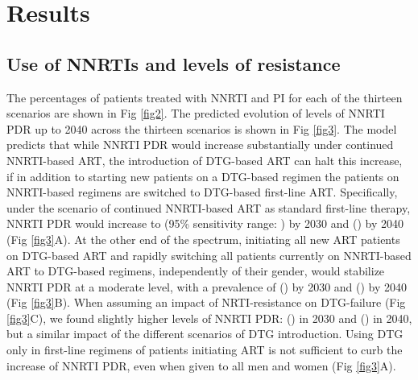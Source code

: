 \documentclass[10pt,letterpaper]{article}
\begin{document}
\section*{Results}
\subsection*{Use of NNRTIs and levels of resistance}
The percentages of patients treated with NNRTI and PI for each of the thirteen scenarios are shown in Fig \ref{fig2}. The predicted evolution of levels of NNRTI PDR up to 2040 across the thirteen scenarios is shown in Fig \ref{fig3}. The model predicts that while NNRTI PDR would increase substantially under continued NNRTI-based ART, the introduction of DTG-based ART can halt this increase, if in addition to starting new patients on a DTG-based regimen the patients on NNRTI-based regimens are switched to DTG-based first-line ART. Specifically, under the scenario of continued NNRTI-based ART as standard first-line therapy, NNRTI PDR would increase to \numberda (95\% sensitivity range: \numberdb) by 2030 and \numberea (\numbereb) by 2040 (Fig \ref{fig3}A). At the other end of the spectrum, initiating all new ART patients on DTG-based ART and rapidly switching all patients currently on NNRTI-based ART to DTG-based regimens, independently of their gender, would stabilize NNRTI PDR at a moderate level, with a prevalence of \numberfa (\numberfb) by 2030 and \numberga (\numbergb) by 2040 (Fig \ref{fig3}B). When assuming an impact of NRTI-resistance on DTG-failure (Fig \ref{fig3}C), we found slightly higher levels of NNRTI PDR: \numberfc (\numberfd) in 2030 and \numbergc (\numbergd) in 2040, but a similar impact of the different scenarios of DTG introduction. Using DTG only in first-line regimens of patients initiating ART is not sufficient to curb the increase of NNRTI PDR, even when given to all men and women (Fig \ref{fig3}A).
\end{document}
